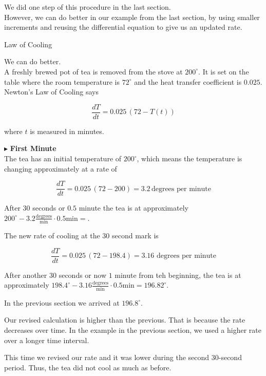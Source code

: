 \documentclass{ximera}
\begin{document}
We did one step of this procedure in the last section. \\


However, we can do better in our example from the last section, by using smaller increments and reusing the differential equation to give us an updated rate.






\begin{example} Law of Cooling 



We can do better. \\



A freshly brewed pot of tea is removed from the stove at $200^{\circ}$.  It is set on the table where the room temperature is $72^{\circ}$ and the heat transfer coefficient is $0.025$. \\


Newton's Law of Cooling says

\[
\frac{dT}{dt} = 0.025 \, (72 - T(t))
\]


where $t$ is measured in minutes.


$\blacktriangleright$ \textbf{First Minute} \\

The tea has an initial temperature of $200^{\circ}$, which means the temperature is changing approximately at a rate of 


\[
\frac{dT}{dt} = 0.025 \, (72 - 200) = 3.2 \, \text{degrees per minute}
\]


After $30$ seconds or $0.5$ minute the tea is at approximately $200^{\circ} - 3.2 \frac{\text{degrees}}{\text{min}} \cdot 0.5 \text{min} = $.


The new rate of cooling at the $30$ second mark is


\[
\frac{dT}{dt} = 0.025 \, (72 - 198.4) = 3.16 \, \, \text{degrees per minute}
\]



After another $30$ seconds or now $1$ minute from teh beginning, the tea is at approximately $198.4^{\circ} - 3.16 \frac{\text{degrees}}{\text{min}} \cdot 0.5 \text{min} = 196.82^{\circ}$.


In the previous section we arrived at $196.8^{\circ}$.

\end{example}





\begin{observation}

Our revised calculation is higher than the previous.  That is because the rate decreases over time.  In the example in the previous section, we used a higher rate over a longer time interval.

This time we revised our rate and it was lower during the second $30$-second period.  Thus, the tea did not cool as much as before.
\end{observation}
\end{document}
